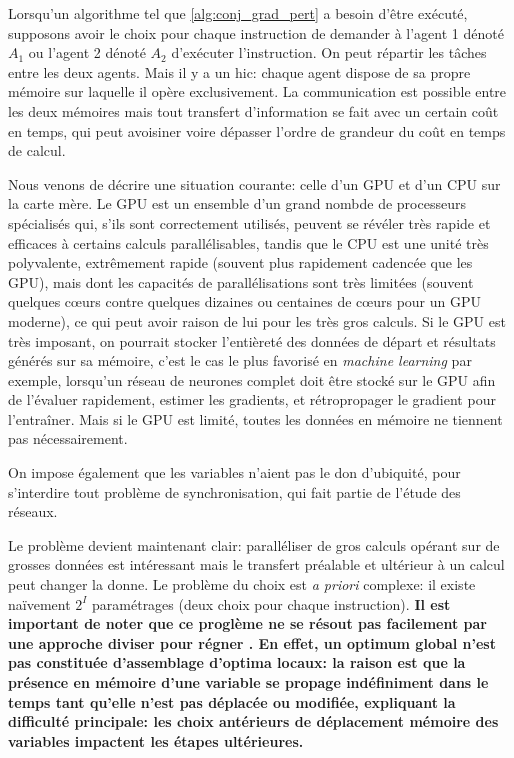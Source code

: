 \documentclass[svgnames,dvipsnames,a4paper,10pt,french]{report}
\begin{document}
\begin{appendices}
Lorsqu'un algorithme tel que \ref{alg:conj_grad_pert} a besoin d'être exécuté, supposons avoir le choix pour chaque instruction de demander à l'agent 1 dénoté $A_1$ ou l'agent 2 dénoté $A_2$ d'exécuter l'instruction. On peut répartir les tâches entre les deux agents. Mais il y a un hic: chaque agent dispose de sa propre mémoire sur laquelle il opère exclusivement. La communication est possible entre les deux mémoires mais tout transfert d'information se fait avec un certain coût en temps, qui peut avoisiner voire dépasser l'ordre de grandeur du coût en temps de calcul. 

Nous venons de décrire une situation courante: celle d'un GPU et d'un CPU sur la carte mère. Le GPU est un ensemble d'un grand nombde de processeurs spécialisés qui, s'ils sont correctement utilisés, peuvent se révéler très rapide et efficaces à certains calculs parallélisables, tandis que le CPU est une unité très polyvalente, extrêmement rapide (souvent plus rapidement cadencée que les GPU), mais dont les capacités de parallélisations sont très limitées (souvent quelques c\oe{}urs contre quelques dizaines ou centaines de c\oe{}urs pour un GPU moderne), ce qui peut avoir raison de lui pour les très gros calculs. Si le GPU est très imposant, on pourrait stocker l'entièreté des données de départ et résultats générés sur sa mémoire, c'est le cas le plus favorisé en \textit{machine learning} par exemple, lorsqu'un réseau de neurones complet doit être stocké sur le GPU afin de l'évaluer rapidement, estimer les gradients, et rétropropager le gradient pour l'entraîner. Mais si le GPU est limité, toutes les données en mémoire ne tiennent pas nécessairement.

On impose également que les variables n'aient pas le don d'ubiquité, pour s'interdire tout problème de synchronisation, qui fait partie de l'étude des réseaux.

Le problème devient maintenant clair: paralléliser de gros calculs opérant sur de grosses données est intéressant mais le transfert préalable et ultérieur à un calcul peut changer la donne. Le problème du choix est \textit{a priori} complexe: il existe naïvement $2^I$ paramétrages (deux choix pour chaque instruction).  \textbf{Il est important de noter que ce proglème ne se résout pas facilement par une approche \og diviser pour régner \og. En effet, un optimum global n'est pas constituée d'assemblage d'optima locaux: la raison est que la présence en mémoire d'une variable se propage indéfiniment dans le temps tant qu'elle n'est pas déplacée ou modifiée, expliquant la difficulté principale: les choix antérieurs de déplacement mémoire des variables impactent les étapes ultérieures.}


\end{appendices}
\end{document}
